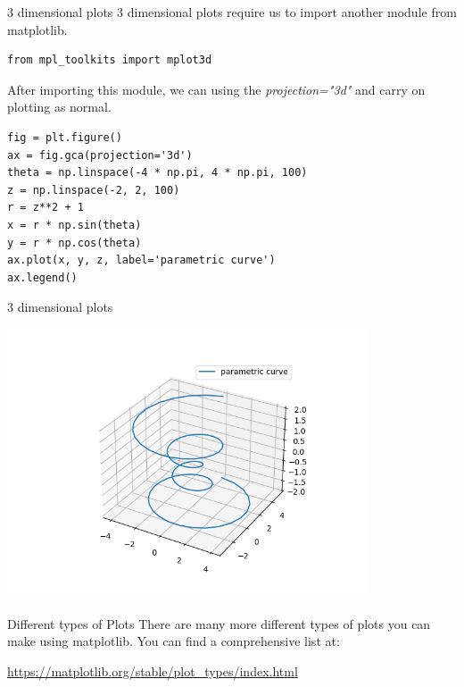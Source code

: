 \documentclass[10pt]{beamer}
\begin{document}
\begin{frame}[label={sec:org5851345},fragile]{3 dimensional plots}
 3 dimensional plots require us to import another module from
matplotlib.

\begin{verbatim}
from mpl_toolkits import mplot3d
\end{verbatim}

After importing this module, we can using the \emph{projection="3d"} and
carry on plotting as normal.

\begin{verbatim}
fig = plt.figure()
ax = fig.gca(projection='3d')
theta = np.linspace(-4 * np.pi, 4 * np.pi, 100)
z = np.linspace(-2, 2, 100)
r = z**2 + 1
x = r * np.sin(theta)
y = r * np.cos(theta)
ax.plot(x, y, z, label='parametric curve')
ax.legend()
\end{verbatim}
\end{frame}

\begin{frame}[label={sec:orgffad524}]{3 dimensional plots}
\begin{center}
\includegraphics[width=0.8\textwidth]{images/3d-figure.png}
\end{center}
\end{frame}

\begin{frame}[label={sec:org9d7c78f}]{Different types of Plots}
There are many more different types of plots you can make using matplotlib. You
can find a comprehensive list at:

\url{https://matplotlib.org/stable/plot\_types/index.html}
\end{frame}
\end{document}
